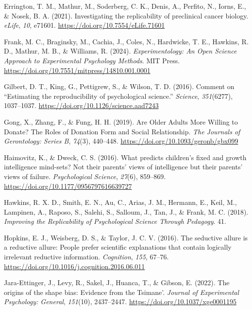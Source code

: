 \documentclass[
  english,
  a4paper,
]{article}
\newlength{\cslhangindent}
\newenvironment{CSLReferences}[2] %
{\begin{list}{}{%
			\setlength{\itemindent}{0pt}
			\setlength{\leftmargin}{0pt}
			\setlength{\parsep}{0pt}
			\ifodd #1
			\setlength{\leftmargin}{\cslhangindent}
			\setlength{\itemindent}{-1\cslhangindent}
			\fi
			\setlength{\itemsep}{#2\baselineskip}}}
	{\end{list}}
\begin{document}
\begin{CSLReferences}{1}{0}
Errington, T. M., Mathur, M., Soderberg, C. K., Denis, A., Perfito, N., Iorns, E., \& Nosek, B. A. (2021). Investigating the replicability of preclinical cancer biology. \emph{eLife}, \emph{10}, e71601. \url{https://doi.org/10.7554/eLife.71601}

Frank, M. C., Braginsky, M., Cachia, J., Coles, N., Hardwicke, T. E., Hawkins, R. D., Mathur, M. B., \& Williams, R. (2024). \emph{Experimentology: {An} {Open} {Science} {Approach} to {Experimental} {Psychology} {Methods}}. MIT Press. \url{https://doi.org/10.7551/mitpress/14810.001.0001}

Gilbert, D. T., King, G., Pettigrew, S., \& Wilson, T. D. (2016). Comment on {``{Estimating} the reproducibility of psychological science.''} \emph{Science}, \emph{351}(6277), 1037--1037. \url{https://doi.org/10.1126/science.aad7243}

Gong, X., Zhang, F., \& Fung, H. H. (2019). Are {Older Adults More Willing} to {Donate}? {The Roles} of {Donation Form} and {Social Relationship}. \emph{The Journals of Gerontology: Series B}, \emph{74}(3), 440--448. \url{https://doi.org/10.1093/geronb/gbx099}

Haimovitz, K., \& Dweck, C. S. (2016). What predicts children's fixed and growth intelligence mind-sets? {Not} their parents' views of intelligence but their parents' views of failure. \emph{Psychological Science}, \emph{27}(6), 859--869. \url{https://doi.org/10.1177/0956797616639727}

Hawkins, R. X. D., Smith, E. N., Au, C., Arias, J. M., Hermann, E., Keil, M., Lampinen, A., Raposo, S., Salehi, S., Salloum, J., Tan, J., \& Frank, M. C. (2018). \emph{Improving the {Replicability} of {Psychological Science Through Pedagogy}}. 41.

Hopkins, E. J., Weisberg, D. S., \& Taylor, J. C. V. (2016). The seductive allure is a reductive allure: {People} prefer scientific explanations that contain logically irrelevant reductive information. \emph{Cognition}, \emph{155}, 67--76. \url{https://doi.org/10.1016/j.cognition.2016.06.011}

Jara-Ettinger, J., Levy, R., Sakel, J., Huanca, T., \& Gibson, E. (2022). The origins of the shape bias: {Evidence} from the {Tsimane}'. \emph{Journal of Experimental Psychology: General}, \emph{151}(10), 2437--2447. \url{https://doi.org/10.1037/xge0001195}


\end{CSLReferences}
\end{document}
